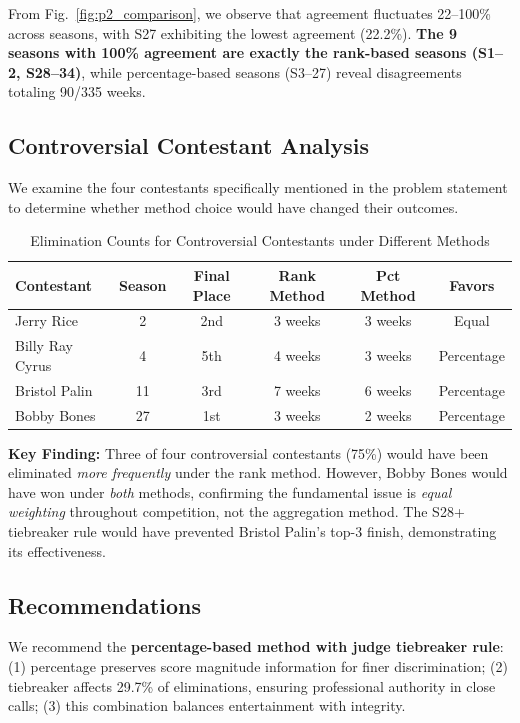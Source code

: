 \documentclass{mcmthesis}
\begin{document}
From Fig.~\ref{fig:p2_comparison}, we observe that agreement fluctuates 22--100\% across seasons, with S27 exhibiting the lowest agreement (22.2\%). \textbf{The 9 seasons with 100\% agreement are exactly the rank-based seasons (S1--2, S28--34)}, while percentage-based seasons (S3--27) reveal disagreements totaling 90/335 weeks.

\subsection{Controversial Contestant Analysis}

We examine the four contestants specifically mentioned in the problem statement to determine whether method choice would have changed their outcomes.

\begin{table}[H]
\centering
\caption{Elimination Counts for Controversial Contestants under Different Methods}
\label{tab:controversial_methods}
\begin{tabular}{lccccc}
\toprule
\textbf{Contestant} & \textbf{Season} & \textbf{Final Place} & \textbf{Rank Method} & \textbf{Pct Method} & \textbf{Favors} \\
\midrule
Jerry Rice & 2 & 2nd & 3 weeks & 3 weeks & Equal \\
Billy Ray Cyrus & 4 & 5th & 4 weeks & 3 weeks & Percentage \\
Bristol Palin & 11 & 3rd & 7 weeks & 6 weeks & Percentage \\
Bobby Bones & 27 & 1st & 3 weeks & 2 weeks & Percentage \\
\bottomrule
\end{tabular}
\end{table}

\textbf{Key Finding:} Three of four controversial contestants (75\%) would have been eliminated \textit{more frequently} under the rank method. However, Bobby Bones would have won under \textit{both} methods, confirming the fundamental issue is \textit{equal weighting} throughout competition, not the aggregation method. The S28+ tiebreaker rule would have prevented Bristol Palin's top-3 finish, demonstrating its effectiveness.

\subsection{Recommendations}

We recommend the \textbf{percentage-based method with judge tiebreaker rule}: (1) percentage preserves score magnitude information for finer discrimination; (2) tiebreaker affects 29.7\% of eliminations, ensuring professional authority in close calls; (3) this combination balances entertainment with integrity.
\end{document}
